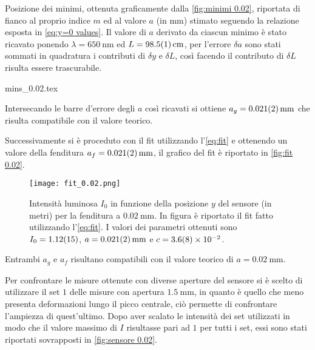 \documentclass[../main.tex]{subfiles}
\begin{document}
\begin{table}[ht!]
    \centering
    \caption{Posizione dei minimi, ottenuta graficamente dalla \autoref{fig:minimi 0.02}, riportata di fianco al proprio indice $m$ ed al valore $a$ (in $\si{\mm}$) stimato seguendo la relazione esposta in \autoref{eq:y=0 values}. Il valore di $a$ derivato da ciascun minimo è stato ricavato ponendo $\lambda = \qty{650}{\nm}$ ed $L = \qty{98.5+-0.1}{\cm}$, per l'errore $\delta a$ sono stati sommati in quadratura i contributi di $\delta y$ e $\delta L$, così facendo il contributo di $\delta L$ risulta essere trascurabile.} %
    {mins_0.02.tex}
    \label{tab:minimi 0.02}
\end{table}

Intersecando le barre d'errore degli $a$ così ricavati si ottiene $a_g = \qty{0.021+-0.002}{\mm}$ che risulta compatibile con il valore teorico.


\newpage

Successivamente si è proceduto con il fit utilizzando l'\autoref{eq:fit} e ottenendo un valore della fenditura $a_f = \qty{0.021+-0.002}{\mm}$, il grafico del fit è riportato in \autoref{fig:fit 0.02}.

\begin{figure}[ht!]
    \centering
    \texttt{[image: fit\_0.02.png]}
    \caption{Intensità luminosa $I_{0}$ in funzione della posizione $y$ del sensore (in metri) per la fenditura a $\qty{0.02}{\mm}$. In figura è riportato il fit fatto utilizzando l'\autoref{eq:fit}. I valori dei parametri ottenuti sono $I_{0} = \num{1.12+-0.15}$, $a = \qty{0.021+-0.002}{\mm}$ e $c = \num{3.6+-0.8e-2}$.}
    \label{fig:fit 0.02}
\end{figure}

Entrambi $a_g$ e $a_f$ risultano compatibili con il valore teorico di $a = \qty{0.02}{\mm}$.

\newpage

Per confrontare le misure ottenute con diverse aperture del sensore si è scelto di utilizzare il set $1$ delle misure con apertura $\qty{1.5}{\mm}$, in quanto è quello che meno presenta deformazioni lungo il picco centrale, ciò permette di confrontare l'ampiezza di quest'ultimo. Dopo aver scalato le intensità dei set utilizzati in modo che il valore massimo di $I$ risultasse pari ad $1$ per tutti i set, essi sono stati riportati sovrapposti in \autoref{fig:sensore 0.02}.
\end{document}
